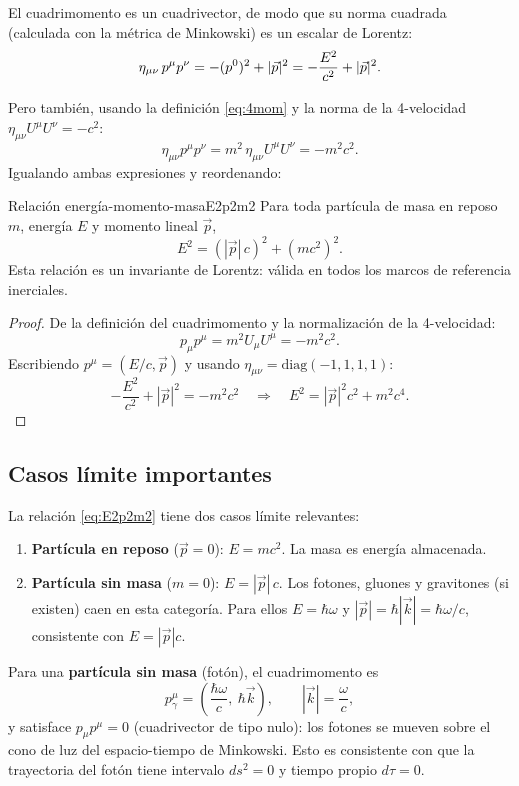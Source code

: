 El cuadrimomento es un cuadrivector, de modo que su norma cuadrada (calculada con la métrica de Minkowski) es un escalar de Lorentz:
\begin{align}
  \eta_{\mu\nu}\,p^\mu p^\nu
  &= -(p^0)^2 + |\vec{p}|^2
  = -\frac{E^2}{c^2} + |\vec{p}|^2. \nl
\end{align}
Pero también, usando la definición \eqref{eq:4mom} y la norma de la 4-velocidad $\eta_{\mu\nu}U^\mu U^\nu = -c^2$:
\[
  \eta_{\mu\nu}p^\mu p^\nu = m^2\,\eta_{\mu\nu}U^\mu U^\nu = -m^2c^2.
\]
Igualando ambas expresiones y reordenando:

\begin{teorema}{Relación energía-momento-masa}{E2p2m2}
Para toda partícula de masa en reposo $m$, energía $E$ y momento lineal $\vec{p}$,
\begin{equation}
  \boxed{E^2 = (|\vec{p}|\,c)^2 + (mc^2)^2.}
  \label{eq:E2p2m2}
\end{equation}
Esta relación es un invariante de Lorentz: válida en todos los marcos de referencia inerciales.
\end{teorema}

\begin{proof}
De la definición del cuadrimomento y la normalización de la 4-velocidad:
\[
  p_\mu p^\mu = m^2 U_\mu U^\mu = -m^2 c^2.
\]
Escribiendo $p^\mu = (E/c, \vec{p})$ y usando $\eta_{\mu\nu} = \mathrm{diag}(-1,1,1,1)$:
\[
  -\frac{E^2}{c^2} + |\vec{p}|^2 = -m^2 c^2
  \quad\Rightarrow\quad E^2 = |\vec{p}|^2 c^2 + m^2 c^4.
\]
\end{proof}

\subsection{Casos límite importantes}

La relación \eqref{eq:E2p2m2} tiene dos casos límite relevantes:

\begin{enumerate}[leftmargin=2em, label=\textbf{\arabic*.}]
  \item \textbf{Partícula en reposo} ($\vec{p} = 0$): $E = mc^2$. La masa es energía almacenada.
  \item \textbf{Partícula sin masa} ($m = 0$): $E = |\vec{p}|\,c$. Los fotones, gluones y gravitones (si existen) caen en esta categoría. Para ellos $E = \hbar\omega$ y $|\vec{p}| = \hbar|\vec{k}| = \hbar\omega/c$, consistente con $E = |\vec{p}|c$.
\end{enumerate}

\begin{importante}
Para una \textbf{partícula sin masa} (fotón), el cuadrimomento es
\[
  p^\mu_{\gamma} = \left(\frac{\hbar\omega}{c},\ \hbar\vec{k}\right), \qquad |\vec{k}| = \frac{\omega}{c},
\]
y satisface $p_\mu p^\mu = 0$ (cuadrivector de tipo nulo): los fotones se mueven sobre el cono de luz del espacio-tiempo de Minkowski. Esto es consistente con que la trayectoria del fotón tiene intervalo $ds^2 = 0$ y tiempo propio $d\tau = 0$.
\end{importante}

